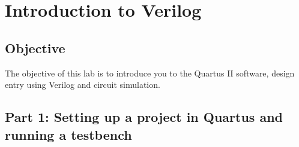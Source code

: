 \chapter{Introduction to Verilog}
\label{introductionToVerilog}
\graphicspath{ {./Lab01SimpleVerilog/Fig} }


\hypertarget{objective}{%
\section{\texorpdfstring{Objective }{Objective }}
\label{section:IntroVerilogObjective}}

The objective of this lab is to introduce you to the Quartus II
software, design entry using Verilog and circuit simulation.


\hypertarget{part-1-setting-up-a-project-in-quartus-and-running-a-testbench}{%
\section{Part 1: Setting up a project in Quartus and running a testbench}
\label{part-1-setting-up-a-project-in-quartus-and-running-a-testbench}}

